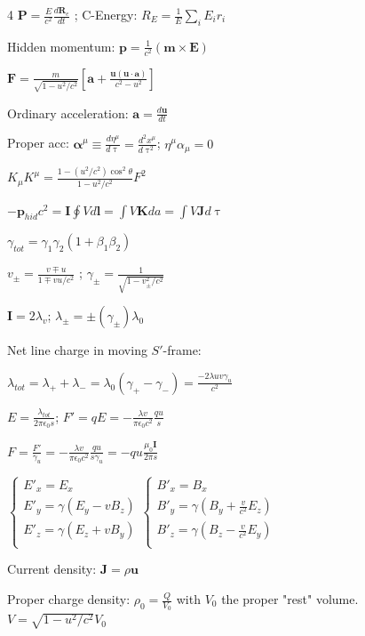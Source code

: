 \documentclass[a4paper,twoside]{article}
\begin{document}
\begin{multicols*}{4}
\(\bm P = \frac{E}{c^2} \frac{d\bm R_e}{dt}\) ;  C-Energy: \(R_E = \frac{1}{E} \sum_i E_i r_i\)

Hidden momentum:
\(\bm p = \frac{1}{c^2} (\bm m\times \bm E )\)

\(\bm F = \frac{m}{\sqrt{1-u^2/c^2}}[\bm a + \frac{\bm u (\bm u \cdot \bm a)}{c^2-u^2}]\)

Ordinary acceleration:
\(\bm a = \frac{d\bm u}{dt}\)

Proper acc:
\(\bm \alpha^\mu \equiv \frac{d\eta^\mu}{d \uptau} = \frac{d^2 x^\mu}{d \uptau^2}\);
\(\eta^\mu \alpha_\mu = 0\)

\(K_\mu K^\mu = \frac{1 - (u^2/c^2) \cos^2 \theta}{1 - u^2/c^2} F^2 \)

\(-\bm p_{hid} c^2 = \bm I \oint V d\bm l = \int V \bm K da =  \int V \bm J d\uptau\)


\(\gamma_{tot} = \gamma_1 \gamma_2 (1 + \beta_1 \beta_2)\)

\(v_\pm = \frac{v \mp u}{1 \mp vu/c^2}\) ; \(\gamma_\pm = \frac{1}{\sqrt{1 - v_\pm^2/c^2}}\)

\(\bm I = 2 \lambda_v \); \(\lambda_\pm = \pm (\gamma_\pm) \lambda_0\)


Net line charge in moving \(S'\)-frame:

\(\lambda_{tot} = \lambda_+ + \lambda_- = \lambda_0 (\gamma_+ - \gamma_-) = \frac{-2 \lambda uv\gamma_u}{c^2}\)

\(E = \frac{\lambda_{tot}}{2 \pi \epsilon_0 s}\);
\(F' = qE = - \frac{\lambda v}{\pi \epsilon_0 c^2} \frac{qu}{s}\)

\(F = \frac{F'}{\gamma_u} = - \frac{\lambda v}{\pi \epsilon_0 c^2} \frac{qu}{s \gamma_u} = -qu \frac{\mu_0 \bm I}{2 \pi s}\)



\(
\begin{cases}
    E'_x = E_x \\
    E'_y = \gamma (E_y - v B_z) \\
    E'_z = \gamma (E_z + v B_y) \\
\end{cases}
\begin{cases}
    B'_x = B_x \\
    B'_y = \gamma (B_y + \frac{v}{c^2} E_z) \\
    B'_z = \gamma (B_z - \frac{v}{c^2} E_y) \\
\end{cases}
\)

Current density:
\(\bm J = \rho \bm u\)

Proper charge density:
\(\rho_0 = \frac{Q}{V_0}\)
 with \(V_0\) the proper "rest" volume.
\(V = \sqrt{1 - u^2/c^2}V_0\)


\end{multicols*}
\end{document}
